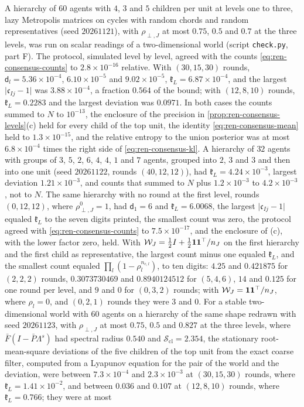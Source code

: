 \begin{numcheck}\label{chk:ren-consensus-levels}
A hierarchy of $60$ agents with $4$, $3$ and $5$ children per unit at levels one to three, lazy Metropolis matrices on cycles with random chords and random representatives (seed $20261121$), with $\rho_{\perp,J}$ at most $0.75$, $0.5$ and $0.7$ at the three levels, was run on scalar readings of a two-dimensional world (script \texttt{check.py}, part F). The protocol, simulated level by level, agreed with the counts \eqref{eq:ren-consensus-counts} to $2.8\times10^{-16}$ relative. With $(30,15,30)$ rounds, $\mathsf d_l=5.36\times10^{-4}$, $6.10\times10^{-5}$ and $9.02\times10^{-5}$, $\mathfrak k_L=6.87\times10^{-4}$, and the largest $\lvert\mathfrak c_{Ij}-1\rvert$ was $3.88\times10^{-4}$, a fraction $0.564$ of the bound; with $(12,8,10)$ rounds, $\mathfrak k_L=0.2283$ and the largest deviation was $0.0971$. In both cases the counts summed to $N$ to $10^{-13}$, the enclosure of the precision in \cref{prop:ren-consensus-levels}(c) held for every child of the top unit, the identity \eqref{eq:ren-consensus-mean} held to $1.3\times10^{-15}$, and the relative entropy to the union posterior was at most $6.8\times10^{-4}$ times the right side of \eqref{eq:ren-consensus-kl}. A hierarchy of $32$ agents with groups of $3$, $5$, $2$, $6$, $4$, $4$, $1$ and $7$ agents, grouped into $2$, $3$ and $3$ and then into one unit (seed $20261122$, rounds $(40,12,12)$), had $\mathfrak k_L=4.24\times10^{-3}$, largest deviation $1.21\times10^{-3}$, and counts that summed to $N$ plus $1.2\times10^{-3}$ to $4.2\times10^{-3}$, not to $N$. The same hierarchy with no round at the first level, rounds $(0,12,12)$, where $\rho_{\perp,J}^0=1$, had $\mathsf d_1=6$ and $\mathfrak k_L=6.0068$, the largest $\lvert\mathfrak c_{Ij}-1\rvert$ equaled $\mathfrak k_L$ to the seven digits printed, the smallest count was zero, the protocol agreed with \eqref{eq:ren-consensus-counts} to $7.5\times10^{-17}$, and the enclosure of (c), with the lower factor zero, held. With $\mathcal W_J=\frac12I+\frac12\mathbf{1}\mathbf{1}^\top/n_J$ on the first hierarchy and the first child as representative, the largest count minus one equaled $\mathfrak k_L$, and the smallest count equaled $\prod_l(1-\rho_l^{n_{\mathrm c,l}})$, to ten digits: $4.25$ and $0.421875$ for $(2,2,2)$ rounds, $0.3073730469$ and $0.8940124512$ for $(5,4,6)$, $14$ and $0.125$ for one round per level, and $9$ and $0$ for $(0,3,2)$ rounds; with $\mathcal W_J=\mathbf{1}\mathbf{1}^\top/n_J$, where $\rho_l=0$, and $(0,2,1)$ rounds they were $3$ and $0$. For a stable two-dimensional world with $60$ agents on a hierarchy of the same shape redrawn with seed $20261123$, with $\rho_{\perp,J}$ at most $0.75$, $0.5$ and $0.827$ at the three levels, where $\bar F(I-\bar P\Lambda^s)$ had spectral radius $0.540$ and $\mathcal S_{\mathrm{cl}}=2.354$, the stationary root-mean-square deviations of the five children of the top unit from the exact coarse filter, computed from a Lyapunov equation for the pair of the world and the deviation, were between $7.3\times10^{-4}$ and $2.3\times10^{-3}$ at $(30,15,30)$ rounds, where $\mathfrak k_L=1.41\times10^{-2}$, and between $0.036$ and $0.107$ at $(12,8,10)$ rounds, where $\mathfrak k_L=0.766$; they were at most 
\end{numcheck}
